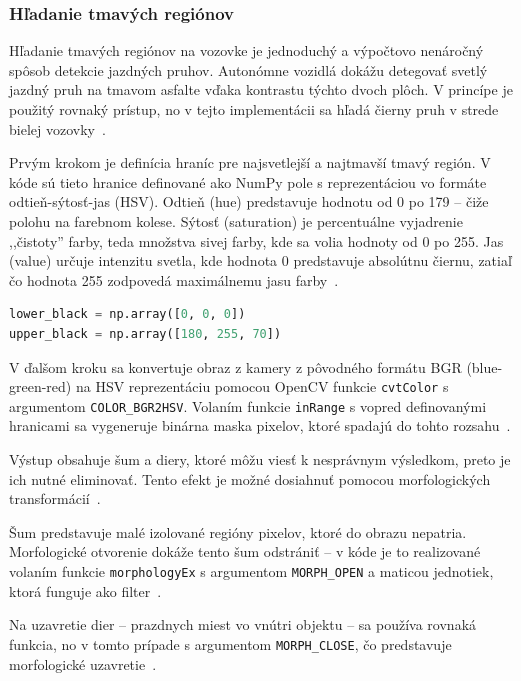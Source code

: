 \subsubsection{Hľadanie tmavých regiónov}
Hľadanie tmavých regiónov na vozovke je jednoduchý a výpočtovo nenáročný spôsob detekcie jazdných pruhov. Autonómne vozidlá dokážu detegovať svetlý jazdný pruh na tmavom asfalte vďaka kontrastu týchto dvoch plôch. V princípe je použitý rovnaký prístup, no v tejto implementácii sa hľadá čierny pruh v strede bielej vozovky~\cite{opencv2025}.\par
Prvým krokom je definícia hraníc pre najsvetlejší a najtmavší tmavý región. V kóde sú tieto hranice definované ako NumPy pole s reprezentáciou vo formáte odtieň-sýtosť-jas (HSV). Odtieň (hue) predstavuje hodnotu od 0 po 179 -- čiže polohu na farebnom kolese. Sýtosť (saturation) je percentuálne vyjadrenie ,,čistoty'' farby, teda množstva sivej farby, kde sa volia hodnoty od 0 po 255. Jas (value) určuje intenzitu svetla, kde hodnota 0 predstavuje absolútnu čiernu, zatiaľ čo hodnota 255 zodpovedá maximálnemu jasu farby~\cite{opencv2025}.\par
\begin{lstlisting}[language=Python, caption=Definície maxima a minima tmavých regiónov]
lower_black = np.array([0, 0, 0])
upper_black = np.array([180, 255, 70])
\end{lstlisting}
V ďalšom kroku sa konvertuje obraz z kamery z pôvodného formátu BGR (blue-green-red) na HSV reprezentáciu pomocou OpenCV funkcie \verb|cvtColor| s argumentom \verb|COLOR_BGR2HSV|. Volaním funkcie \verb|inRange| s vopred definovanými hranicami sa vygeneruje binárna maska pixelov, ktoré spadajú do tohto rozsahu~\cite{opencv2025}.\par
Výstup obsahuje šum a diery, ktoré môžu viesť k nesprávnym výsledkom, preto je ich nutné eliminovať. Tento efekt je možné dosiahnuť pomocou morfologických transformácií~\cite{opencv2025}.\par
Šum predstavuje malé izolované regióny pixelov, ktoré do obrazu nepatria. Morfologické otvorenie dokáže tento šum odstrániť -- v kóde je to realizované volaním funkcie \verb|morphologyEx| s argumentom \verb|MORPH_OPEN| a maticou jednotiek, ktorá funguje ako filter~\cite{opencv2025}.\par
Na uzavretie dier -- prazdnych miest vo vnútri objektu -- sa používa rovnaká funkcia, no v tomto prípade s argumentom \verb|MORPH_CLOSE|, čo predstavuje morfologické uzavretie~\cite{opencv2025}.\par
